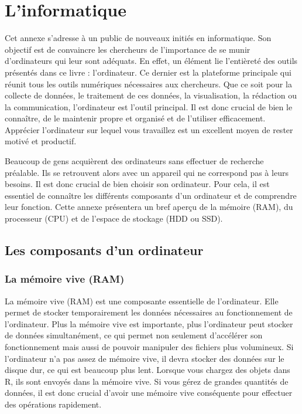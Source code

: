 \documentclass[
  letterpaper,
  DIV=11,
  numbers=noendperiod]{scrreprt}
\begin{document}

\chapter{L'informatique}\label{linformatique}

Cet annexe s'adresse à un public de nouveaux initiés en informatique.
Son objectif est de convaincre les chercheurs de l'importance de se
munir d'ordinateurs qui leur sont adéquats. En effet, un élément lie
l'entièreté des outils présentés dans ce livre : l'ordinateur. Ce
dernier est la plateforme principale qui réunit tous les outils
numériques nécessaires aux chercheurs. Que ce soit pour la collecte de
données, le traitement de ces données, la visualisation, la rédaction ou
la communication, l'ordinateur est l'outil principal. Il est donc
crucial de bien le connaître, de le maintenir propre et organisé et de
l'utiliser efficacement. Apprécier l'ordinateur sur lequel vous
travaillez est un excellent moyen de rester motivé et productif.

Beaucoup de gens acquièrent des ordinateurs sans effectuer de recherche
préalable. Ils se retrouvent alors avec un appareil qui ne correspond
pas à leurs besoins. Il est donc crucial de bien choisir son ordinateur.
Pour cela, il est essentiel de connaître les différents composants d'un
ordinateur et de comprendre leur fonction. Cette annexe présentera un
bref aperçu de la mémoire (RAM), du processeur (CPU) et de l'espace de
stockage (HDD ou SSD).

\section{Les composants d'un
ordinateur}\label{les-composants-dun-ordinateur}

\subsection{La mémoire vive (RAM)}\label{la-muxe9moire-vive-ram}

La mémoire vive (RAM) est une composante essentielle de l'ordinateur.
Elle permet de stocker temporairement les données nécessaires au
fonctionnement de l'ordinateur. Plus la mémoire vive est importante,
plus l'ordinateur peut stocker de données simultanément, ce qui permet
non seulement d'accélérer son fonctionnement mais aussi de pouvoir
manipuler des fichiers plus volumineux. Si l'ordinateur n'a pas assez de
mémoire vive, il devra stocker des données sur le disque dur, ce qui est
beaucoup plus lent. Lorsque vous chargez des objets dans R, ils sont
envoyés dans la mémoire vive. Si vous gérez de grandes quantités de
données, il est donc crucial d'avoir une mémoire vive conséquente pour
effectuer des opérations rapidement.
\end{document}

